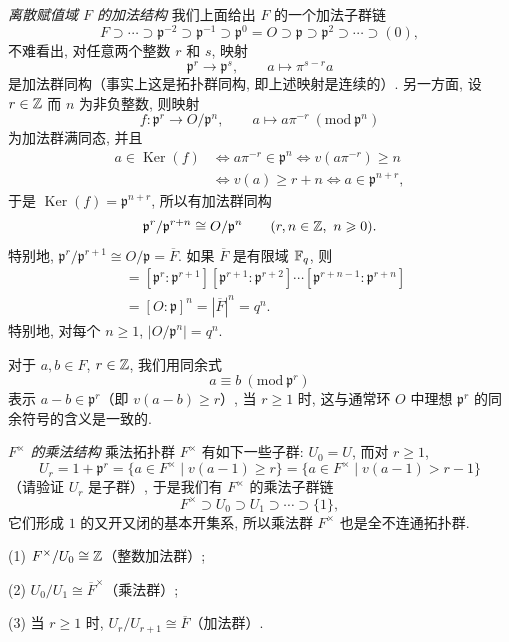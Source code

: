\emph{离散赋值域 $F$ 的加法结构} 我们上面给出 $F$ 的一个加法子群链
\[
  F\supset\cdots\supset\mathfrak{p}^{-2}\supset\mathfrak{p}^{-1}\supset\mathfrak{p}^0=O\supset\mathfrak{p}\supset\mathfrak{p}^2\supset\cdots\supset(0),
\]
不难看出, 对任意两个整数 $r$ 和 $s$, 映射
\[
  \mathfrak{p}^r\to\mathfrak{p}^s,\qquad a\mapsto\pi^{s-r}a
\]
是加法群同构（事实上这是拓扑群同构, 即上述映射是连续的）. 另一方面, 设 $r\in\mathbb{Z}$ 而 $n$ 为非负整数, 则映射
\[
  f\colon\mathfrak{p}^r\to O/\mathfrak{p}^n,\qquad a\mapsto a\pi^{-r}\ (\mathrm{mod}\ \mathfrak{p}^n)
\]
为加法群满同态, 并且
\begin{align*}
  a\in\operatorname{Ker}(f)&\Leftrightarrow a\pi^{-r}\in\mathfrak{p}^n\Leftrightarrow v(a\pi^{-r})\geqslant n\\
  &\Leftrightarrow v(a)\geqslant r+n\Leftrightarrow a\in\mathfrak{p}^{n+r},
\end{align*}
于是 $\operatorname{Ker}(f)=\mathfrak{p}^{n+r}$, 所以有加法群同构
\[
  \mathfrak{p}^r/\mathfrak{p}^{r+n}\cong O/\mathfrak{p}^n\qquad(r,n\in\mathbb{Z},\ n\geqslant 0).
\]
特别地, $\mathfrak{p}^r/\mathfrak{p}^{r+1}\cong O/\mathfrak{p}=\overline{F}$. 如果 $\overline{F}$ 是有限域 $\mathbb{F}_q$, 则
\begin{align*}
  [\mathfrak{p}^r:\mathfrak{p}^{r+n}]&=[\mathfrak{p}^r:\mathfrak{p}^{r+1}][\mathfrak{p}^{r+1}:\mathfrak{p}^{r+2}]\cdots[\mathfrak{p}^{r+n-1}:\mathfrak{p}^{r+n}]\\
  &=[O:\mathfrak{p}]^n=|\overline{F}|^n=q^n.
\end{align*}
特别地, 对每个 $n\geqslant 1$, $|O/\mathfrak{p}^n|=q^n$.

对于 $a,b\in F$, $r\in\mathbb{Z}$, 我们用同余式
\[
  a\equiv b\ (\mathrm{mod}\ \mathfrak{p}^r)
\]
表示 $a-b\in\mathfrak{p}^r$（即 $v(a-b)\geqslant r$）, 当 $r\geqslant 1$ 时, 这与通常环 $O$ 中理想 $\mathfrak{p}^r$ 的同余符号的含义是一致的.

\emph{$F^{\times}$ 的乘法结构} 乘法拓扑群 $F^{\times}$ 有如下一些子群: $U_0=U$, 而对 $r\geqslant 1$,
\[
  U_r=1+\mathfrak{p}^r=\{a\in F^{\times}\mid v(a-1)\geqslant r\}
  =\{a\in F^{\times}\mid v(a-1)>r-1\}
\]
（请验证 $U_r$ 是子群）, 于是我们有 $F^{\times}$ 的乘法子群链
\[
  F^{\times}\supset U_0\supset U_1\supset\cdots\supset\{1\},
\]
它们形成 $1$ 的又开又闭的基本开集系, 所以乘法群 $F^{\times}$ 也是全不连通拓扑群.

\begin{lemma}\label{lem:ch7-7}
(1) $F^{\times}/U_0\cong\mathbb{Z}$（整数加法群）;

(2) $U_0/U_1\cong\overline{F}^{\times}$（乘法群）;

(3) 当 $r\geqslant 1$ 时, $U_r/U_{r+1}\cong\overline{F}$（加法群）.
\end{lemma}

